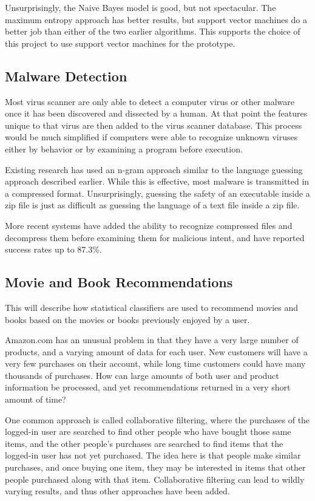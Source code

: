 \documentclass[12pt]{article}
\begin{document}
Unsurprisingly, the Naive Bayes model is good, but not spectacular. The maximum entropy approach has better
results, but support vector machines do a better job than either of the two earlier algorithms. This supports
the choice of this project to use support vector machines for the prototype.
\subsection{Malware Detection}
Most virus scanner are only able to detect a computer virus or other malware once it has been discovered and
dissected by a human. At that point the features unique to that virus are then added to the virus scanner
database.  This process would be much simplified if computers were able to recognize unknown viruses either by
behavior or by examining a program before execution.

Existing research has used an n-gram approach similar to the language guessing approach described
earlier. While this is effective, most malware is transmitted in a compressed format. Unsurprisingly, guessing
the safety of an executable inside a zip file is just as difficult as guessing the language of a text file
inside a zip file.

More recent systems have added the ability to recognize compressed files and decompress them before examining
them for malicious intent, and have reported success rates up to 87.3\%. \citep{perdisci2008mcboost}
\subsection{Movie and Book Recommendations}
This will describe how statistical classifiers are used to recommend movies \citep{basu1998recommendation} and
books \citep{linden2003amazon} based on the movies or books previously enjoyed by a user.

Amazon.com has an unusual problem in that they have a very large number of products, and a varying amount of
data for each user. New customers will have a very few purchases on their account, while long time customers
could have many thousands of purchases. How can large amounts of both user and product information be
processed, and yet recommendations returned in a very short amount of time?

One common approach is called collaborative filtering, where the purchases of the logged-in user are searched
to find other people who have bought those same items, and the other people's purchases are searched to find
items that the logged-in user has not yet purchased. The idea here is that people make similar purchases, and
once buying one item, they may be interested in items that other people purchased along with that item.
Collaborative filtering can lead to wildly varying results, and thus other approaches have been added.
\end{document}
